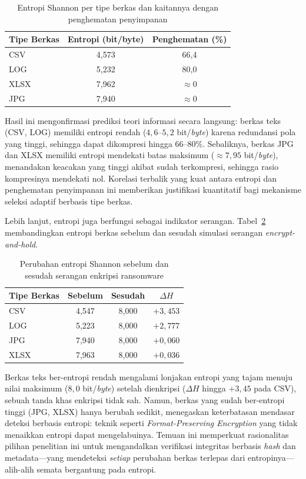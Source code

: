 \documentclass{iaesarticle}
\begin{document}
\begin{table}[H]
\centering
\fontsize{8pt}{10pt}\selectfont
\caption{Entropi Shannon per tipe berkas dan kaitannya dengan penghematan penyimpanan}
\label{tab:entropy_type}
\begin{tabular}{l c c}
\hline
\textbf{Tipe Berkas} & \textbf{Entropi (bit/byte)} & \textbf{Penghematan (\%)} \\
\hline
CSV  & 4,573 & 66,4 \\
LOG  & 5,232 & 80,0 \\
XLSX & 7,962 & $\approx$0 \\
JPG  & 7,940 & $\approx$0 \\
\hline
\end{tabular}
\end{table}

Hasil ini mengonfirmasi prediksi teori informasi secara langsung: berkas teks (CSV, LOG) memiliki entropi rendah ($4{,}6$--$5{,}2$ bit/\textit{byte}) karena redundansi pola yang tinggi, sehingga dapat dikompresi hingga $66$--$80\%$. Sebaliknya, berkas JPG dan XLSX memiliki entropi mendekati batas maksimum ($\approx 7{,}95$ bit/\textit{byte}), menandakan keacakan yang tinggi akibat sudah terkompresi, sehingga rasio kompresinya mendekati nol. Korelasi terbalik yang kuat antara entropi dan penghematan penyimpanan ini memberikan justifikasi kuantitatif bagi mekanisme seleksi adaptif berbasis tipe berkas.

Lebih lanjut, entropi juga berfungsi sebagai indikator serangan. Tabel~\ref{tab:entropy_attack} membandingkan entropi berkas sebelum dan sesudah simulasi serangan \textit{encrypt-and-hold}.

\begin{table}[H]
\centering
\fontsize{8pt}{10pt}\selectfont
\caption{Perubahan entropi Shannon sebelum dan sesudah serangan enkripsi ransomware}
\label{tab:entropy_attack}
\begin{tabular}{l c c c}
\hline
\textbf{Tipe Berkas} & \textbf{Sebelum} & \textbf{Sesudah} & \textbf{$\Delta H$} \\
\hline
CSV  & 4,547 & 8,000 & $+3{,}453$ \\
LOG  & 5,223 & 8,000 & $+2{,}777$ \\
JPG  & 7,940 & 8,000 & $+0{,}060$ \\
XLSX & 7,963 & 8,000 & $+0{,}036$ \\
\hline
\end{tabular}
\end{table}

Berkas teks ber-entropi rendah mengalami lonjakan entropi yang tajam menuju nilai maksimum ($8{,}0$ bit/\textit{byte}) setelah dienkripsi ($\Delta H$ hingga $+3{,}45$ pada CSV), sebuah tanda khas enkripsi tidak sah. Namun, berkas yang sudah ber-entropi tinggi (JPG, XLSX) hanya berubah sedikit, menegaskan keterbatasan mendasar deteksi berbasis entropi: teknik seperti \textit{Format-Preserving Encryption} yang tidak menaikkan entropi dapat mengelabuinya. Temuan ini memperkuat rasionalitas pilihan penelitian ini untuk mengandalkan verifikasi integritas berbasis \textit{hash} dan metadata---yang mendeteksi \textit{setiap} perubahan berkas terlepas dari entropinya---alih-alih semata bergantung pada entropi.
\end{document}
